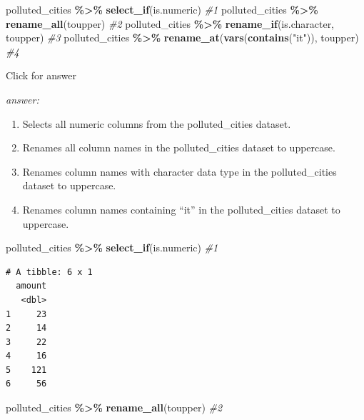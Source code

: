\documentclass[
]{book}
\newenvironment{Shaded}{\begin{snugshade}}{\end{snugshade}}
\newcommand{\CommentTok}[1]{\textcolor[rgb]{0.56,0.35,0.01}{\textit{#1}}}
\newcommand{\FunctionTok}[1]{\textcolor[rgb]{0.13,0.29,0.53}{\textbf{#1}}}
\newcommand{\NormalTok}[1]{#1}
\newcommand{\SpecialCharTok}[1]{\textcolor[rgb]{0.81,0.36,0.00}{\textbf{#1}}}
\newcommand{\StringTok}[1]{\textcolor[rgb]{0.31,0.60,0.02}{#1}}
\providecommand{\tightlist}{%
  \setlength{\itemsep}{0pt}\setlength{\parskip}{0pt}}
\begin{document}
\begin{Shaded}
\begin{Highlighting}[]
\NormalTok{polluted\_cities }\SpecialCharTok{\%\textgreater{}\%} \FunctionTok{select\_if}\NormalTok{(is.numeric) }\CommentTok{\#1}
\NormalTok{polluted\_cities }\SpecialCharTok{\%\textgreater{}\%} \FunctionTok{rename\_all}\NormalTok{(toupper) }\CommentTok{\#2}
\NormalTok{polluted\_cities }\SpecialCharTok{\%\textgreater{}\%} \FunctionTok{rename\_if}\NormalTok{(is.character, toupper) }\CommentTok{\#3}
\NormalTok{polluted\_cities }\SpecialCharTok{\%\textgreater{}\%} \FunctionTok{rename\_at}\NormalTok{(}\FunctionTok{vars}\NormalTok{(}\FunctionTok{contains}\NormalTok{(}\StringTok{"it"}\NormalTok{)), toupper) }\CommentTok{\#4}
\end{Highlighting}
\end{Shaded}

Click for answer

\emph{answer:}

\begin{enumerate}
\def\labelenumi{\arabic{enumi}.}
\tightlist
\item
  Selects all numeric columns from the polluted\_cities dataset.
\item
  Renames all column names in the polluted\_cities dataset to uppercase.
\item
  Renames column names with character data type in the polluted\_cities dataset to uppercase.
\item
  Renames column names containing ``it'' in the polluted\_cities dataset to uppercase.
\end{enumerate}

\begin{Shaded}
\begin{Highlighting}[]
\NormalTok{polluted\_cities }\SpecialCharTok{\%\textgreater{}\%} \FunctionTok{select\_if}\NormalTok{(is.numeric) }\CommentTok{\#1}
\end{Highlighting}
\end{Shaded}

\begin{verbatim}
# A tibble: 6 x 1
  amount
   <dbl>
1     23
2     14
3     22
4     16
5    121
6     56
\end{verbatim}

\begin{Shaded}
\begin{Highlighting}[]
\NormalTok{polluted\_cities }\SpecialCharTok{\%\textgreater{}\%} \FunctionTok{rename\_all}\NormalTok{(toupper) }\CommentTok{\#2}
\end{Highlighting}
\end{Shaded}
\end{document}
